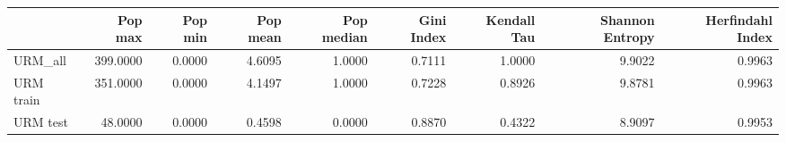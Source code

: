 \begin{tabular}{lrrrrrrrr}
\toprule
{} &  Pop max &  Pop min &  Pop mean &  Pop median &  Gini Index &  Kendall Tau &  Shannon Entropy &  Herfindahl Index \\
\midrule
URM\_all   & 399.0000 &   0.0000 &    4.6095 &      1.0000 &      0.7111 &       1.0000 &           9.9022 &            0.9963 \\
URM train & 351.0000 &   0.0000 &    4.1497 &      1.0000 &      0.7228 &       0.8926 &           9.8781 &            0.9963 \\
URM test  &  48.0000 &   0.0000 &    0.4598 &      0.0000 &      0.8870 &       0.4322 &           8.9097 &            0.9953 \\
\bottomrule
\end{tabular}
